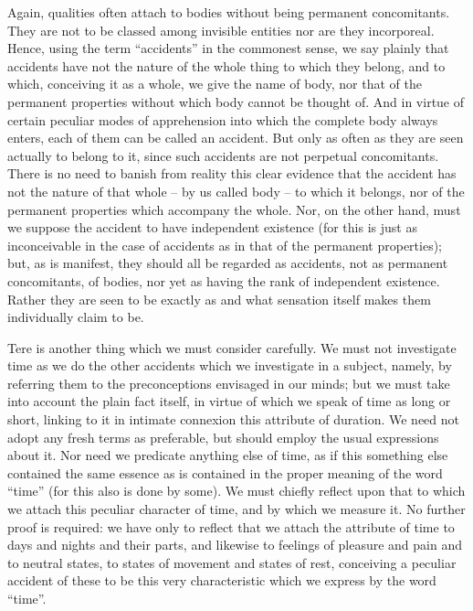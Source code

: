 \documentclass{stex}
\begin{document}
Again, qualities often attach to bodies without being permanent concomitants.
They are not to be classed among invisible entities nor are they incorporeal.
Hence, using the term \enquote{accidents} in the commonest sense, we say plainly that accidents have not the nature of the whole thing to which they belong, and to which, conceiving it as a whole, we give the name of body, nor that of the permanent properties without which body cannot be thought of.
And in virtue of certain peculiar modes of apprehension into which the complete body always enters, each of them can be called an accident.
But only as often as they are seen actually to belong to it, since such accidents are not perpetual concomitants.
There is no need to banish from reality this clear evidence that the accident has not the nature of that whole – by us called body – to which it belongs, nor of the permanent properties which accompany the whole.
Nor, on the other hand, must we suppose the accident to have independent existence (for this is just as inconceivable in the case of accidents as in that of the permanent properties); but, as is manifest, they should all be regarded as accidents, not as permanent concomitants, of bodies, nor yet as having the rank of independent existence.
Rather they are seen to be exactly as and what sensation itself makes them individually claim to be.

Tere is another thing which we must consider carefully.
We must not investigate time as we do the other accidents which we investigate in a subject, namely, by referring them to the preconceptions envisaged in our minds; but we must take into account the plain fact itself, in virtue of which we speak of time as long or short, linking to it in intimate connexion this attribute of duration.
We need not adopt any fresh terms as preferable, but should employ the usual expressions about it.
Nor need we predicate anything else of time, as if this something else contained the same essence as is contained in the proper meaning of the word \enquote{time} (for this also is done by some).
We must chiefly reflect upon that to which we attach this peculiar character of time, and by which we measure it.
No further proof is required: we have only to reflect that we attach the attribute of time to days and nights and their parts, and likewise to feelings of pleasure and pain and to neutral states, to states of movement and states of rest, conceiving a peculiar accident of these to be this very characteristic which we express by the word \enquote{time}.
\end{document}

